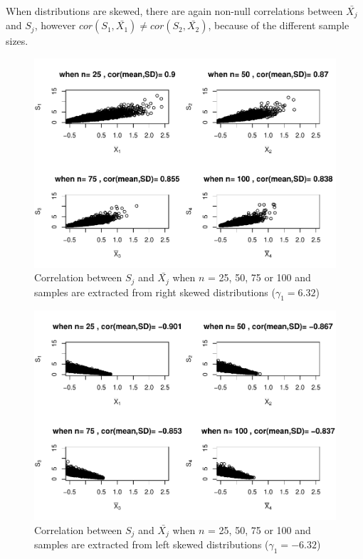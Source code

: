 \documentclass[
  english,
  man,mask,floatsintext]{apa6}
\begin{document}
When distributions are skewed, there are again non-null correlations between \(\bar{X_j}\) and \(S_j\), however \(cor(S_1,\bar{X_1}) \neq cor(S_2,\bar{X_2})\), because of the different sample sizes.

\begin{figure}
\centering
\includegraphics{Correlation_files/figure-latex/Homunbalcorasafctofn1-1.pdf}
\caption{\label{fig:Homunbalcorasafctofn1}Correlation between \(S_j\) and \(\bar{X_j}\) when \(n\) = 25, 50, 75 or 100 and samples are extracted from right skewed distributions (\(\gamma_1 = 6.32\))}
\end{figure}

\begin{figure}
\centering
\includegraphics{Correlation_files/figure-latex/Homunbalcorasafctofn2-1.pdf}
\caption{\label{fig:Homunbalcorasafctofn2}Correlation between \(S_j\) and \(\bar{X_j}\) when \(n\) = 25, 50, 75 or 100 and samples are extracted from left skewed distributions (\(\gamma_1 = -6.32\))}
\end{figure}
\end{document}
